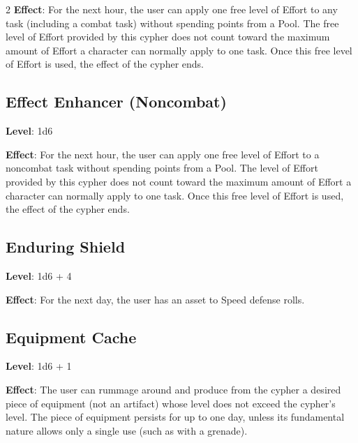 \begin{multicols}{2}
\textbf{Effect}: For the next hour, the user can apply one free level of Effort to any task (including a combat task) without spending points from a Pool. The free level of Effort provided by this cypher does not count toward the maximum amount of Effort a character can normally apply to one task. Once this free level of Effort is used, the effect of the cypher ends.

\subsection{Effect Enhancer (Noncombat)}

\textbf{Level}: 1d6

\textbf{Effect}: For the next hour, the user can apply one free level of Effort to a noncombat task without spending points from a Pool. The level of Effort provided by this cypher does not count toward the maximum amount of Effort a character can normally apply to one task. Once this free level of Effort is used, the effect of the cypher ends.

\subsection{Enduring Shield}

\textbf{Level}: 1d6 + 4

\textbf{Effect}: For the next day, the user has an asset to Speed defense rolls.

\subsection{Equipment Cache}

\textbf{Level}: 1d6 + 1

\textbf{Effect}: The user can rummage around and produce from the cypher a desired piece of equipment (not an artifact) whose level does not exceed the cypher’s level. The piece of equipment persists for up to one day, unless its fundamental nature allows only a single use (such as with a grenade).


\end{multicols}
